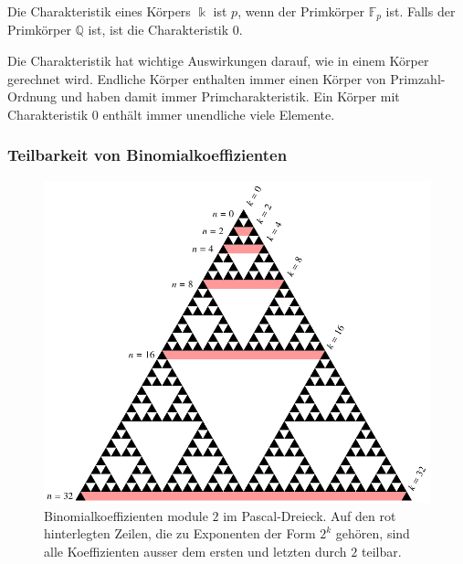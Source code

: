\begin{definition}
Die Charakteristik eines Körpers $\Bbbk$ ist $p$, wenn der Primkörper
$\mathbb{F}_p$ ist.
Falls der Primkörper $\mathbb{Q}$ ist, ist die Charakteristik $0$.
\end{definition}

Die Charakteristik hat wichtige Auswirkungen darauf, wie in einem Körper
gerechnet wird.
Endliche Körper enthalten immer einen Körper von Primzahl-Ordnung und
haben damit immer Primcharakteristik.
Ein Körper mit Charakteristik $0$ enthält immer unendliche viele
Elemente.

\subsubsection{Teilbarkeit von Binomialkoeffizienten}
\begin{figure}
\centering
\includegraphics{chapters/30-endlichekoerper/images/binomial2.pdf}
\caption{Binomialkoeffizienten module $2$ im Pascal-Dreieck.
Auf den rot hinterlegten Zeilen, die zu Exponenten der Form $2^k$ gehören,
sind alle Koeffizienten ausser dem ersten und letzten durch $2$ teilbar.
\label{buch:endliche-koerper:fig:binomial2}}
\end{figure}
\bgroup

